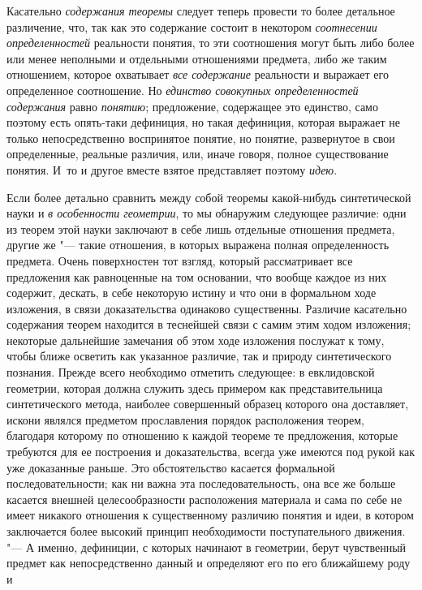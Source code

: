 {{Касательно {\em содержания
теоремы} следует теперь провести то более детальное
различение, что, так как это содержание состоит в некотором
{\em соотнесении определенностей}
реальности понятия, то эти соотношения могут быть либо более
или менее неполными и отдельными отношениями предмета, либо же таким
отношением, которое охватывает {\em все
содержание} реальности и выражает его определенное
соотношение. Но {\em единство совокупных
определенностей содержания} равно
{\em понятию};
предложение, содержащее это единство, само поэтому есть
опять-таки дефиниция, но такая дефиниция, которая выражает не только
непосредственно воспринятое понятие, но понятие, развернутое в свои
определенные, реальные различия, или, иначе говоря, полное существование
понятия. И~то и другое вместе взятое представляет поэтому
{\em идею}.

Если более детально сравнить между собой теоремы какой-нибудь
синтетической науки и {\em в особенности
геометрии}, то мы обнаружим следующее различие: одни из
теорем этой науки заключают в себе лишь отдельные отношения предмета,
другие же "--- такие отношения, в которых выражена полная
определенность предмета. Очень поверхностен тот взгляд, который
рассматривает все предложения как равноценные на том основании, что вообще
каждое из них содержит, дескать, в себе некоторую истину и что они в
формальном ходе изложения, в связи доказательства одинаково существенны.
Различие касательно содержания теорем находится в теснейшей связи с самим
этим ходом изложения; некоторые дальнейшие замечания об этом ходе изложения
послужат к тому, чтобы ближе осветить как указанное
различие, так и природу синтетического познания. Прежде всего необходимо
отметить следующее: в евклидовской геометрии, которая должна служить здесь
примером как представительница синтетического метода, наиболее совершенный
образец которого она доставляет, искони являлся предметом прославления
порядок расположения теорем, благодаря которому по отношению к каждой
теореме те предложения, которые требуются для ее построения и
доказательства, всегда уже имеются под рукой как уже доказанные раньше. Это
обстоятельство касается формальной последовательности; как ни важна эта
последовательность, она все же больше касается внешней целесообразности
расположения материала и сама по себе не имеет никакого отношения к
существенному различию понятия и идеи, в котором заключается более высокий
принцип необходимости поступательного движения. "--- А именно,
дефиниции, с которых начинают в геометрии, берут чувственный предмет как
непосредственно данный и определяют его по его ближайшему роду и
}}
